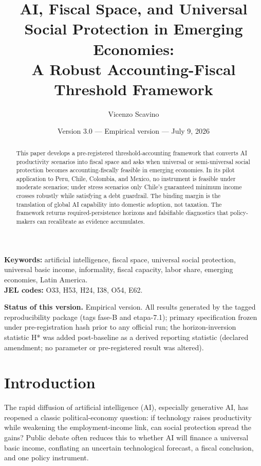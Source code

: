 \documentclass[11pt,a4paper]{article}
\title{AI, Fiscal Space, and Universal Social Protection in Emerging Economies:\\[0.2em]A Robust Accounting-Fiscal Threshold Framework}
\author{Vicenzo Scavino}
\affil{Preliminary methodological draft}
\date{Version 3.0 --- Empirical version --- July 9, 2026}
\begin{document}
\maketitle

\begin{abstract}
This paper develops a pre-registered threshold-accounting framework that converts AI productivity scenarios into fiscal space and asks when universal or semi-universal social protection becomes accounting-fiscally feasible in emerging economies. In its pilot application to Peru, Chile, Colombia, and Mexico, no instrument is feasible under moderate scenarios; under stress scenarios only Chile's guaranteed minimum income crosses robustly while satisfying a debt guardrail. The binding margin is the translation of global AI capability into domestic adoption, not taxation. The framework returns required-persistence horizons and falsifiable diagnostics that policy-makers can recalibrate as evidence accumulates.
\end{abstract}

\noindent \textbf{Keywords:} artificial intelligence, fiscal space, universal social protection, universal basic income, informality, fiscal capacity, labor share, emerging economies, Latin America.\\
\textbf{JEL codes:} O33, H53, H24, I38, O54, E62.

\vspace{0.75em}
\noindent\textbf{Status of this version.} Empirical version. All results generated by the tagged reproducibility package (tags fase-B and etapa-7.1); primary specification frozen under pre-registration hash prior to any official run; the horizon-inversion statistic H* was added post-baseline as a derived reporting statistic (declared amendment; no parameter or pre-registered result was altered).

\newpage

\section{Introduction}

The rapid diffusion of artificial intelligence (AI), especially generative AI, has reopened a classic political-economy question: if technology raises productivity while weakening the employment-income link, can social protection spread the gains? Public debate often reduces this to whether AI will finance a universal basic income, conflating an uncertain technological forecast, a fiscal conclusion, and one policy instrument.
\end{document}
